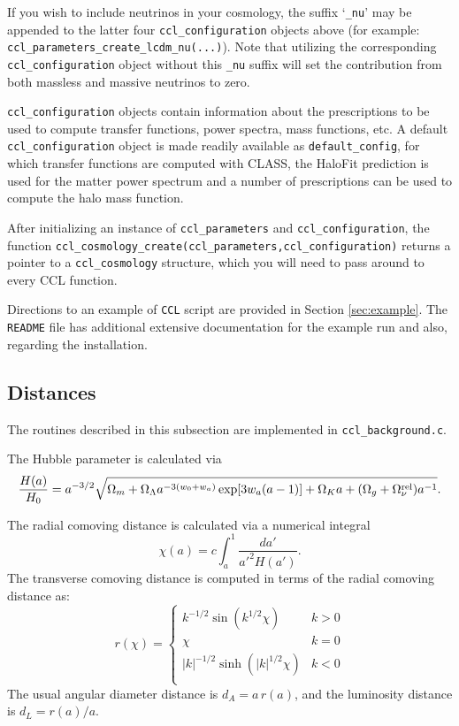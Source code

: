 \documentclass[\docopts]{\docclass}
\begin{document}
If you wish to include neutrinos in your cosmology, the suffix `{\tt \_nu}' may be appended to the latter four {\tt ccl\_configuration} objects above (for example: {\tt ccl\_parameters\_create\_lcdm\_nu(...)}). Note that utilizing the corresponding {\tt ccl\_configuration} object without this {\tt \_nu} suffix will set the contribution from both massless and massive neutrinos to zero.

{\tt ccl\_configuration} objects contain information about the prescriptions to be used to compute transfer functions, power spectra, mass functions, etc. A default {\tt ccl\_configuration} object is made readily available as {\tt default\_config}, for which transfer functions are computed with CLASS, the HaloFit prediction is used for the matter power spectrum and a number of prescriptions can be used to compute the halo mass function.

After initializing an instance of {\tt ccl\_parameters} and {\tt ccl\_configuration}, the function {\tt ccl\_cosmology\_create(ccl\_parameters,ccl\_configuration)} returns a pointer to a {\tt ccl\_cosmology} structure, which you will need to pass around to every CCL function.

Directions to an example of {\tt CCL} script are provided in Section \ref{sec:example}. The {\tt README} file has additional extensive documentation for the example run and also, regarding the installation.

\subsection{Distances}
\label{sec:distances}

The routines described in this subsection are implemented in {\tt ccl\_background.c}.

The Hubble parameter is calculated via
%
\begin{equation}
\frac{H(a)}{H_0} = a^{-3/2}\sqrt{\Omega_m+\Omega_\Lambda a^{-3(w_0+w_a)}
    \exp[3 w_a (a-1)]+\Omega_K a +(\Omega_g+\Omega_\nu^{\rm rel}) a^{-1}}.
\end{equation}

The radial comoving distance is calculated via a numerical integral
\begin{equation}
 \chi(a)= c \int_a^1 \frac{da'}{a'^2 H(a')}.
\end{equation}
The transverse comoving distance is computed in terms of the radial comoving distance as:
\begin{equation}\label{eq:angdist}
 r(\chi)=\left\{\begin{array}{cc}
                 k^{-1/2}\sin(k^{1/2}\chi) & k>0\\
                 \chi & k=0\\
                 |k|^{-1/2}\sinh(|k|^{1/2}\chi) & k<0\\
                \end{array}\right.
\end{equation}
The usual angular diameter distance is $d_A=a\,r(a)$, and the luminosity distance is
$d_L=r(a)/a$.
\end{document}
